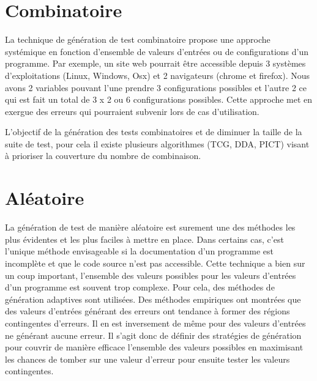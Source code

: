 
\section{Combinatoire}

La technique de génération de test combinatoire propose une approche systémique en fonction d'ensemble de valeurs d'entrées ou de configurations d'un programme. Par exemple, un site web pourrait être accessible depuis 3 systèmes d'exploitations (Linux, Windows, Osx) et 2 navigateurs (chrome et firefox). Nous avons 2 variables pouvant l'une prendre 3 configurations possibles et l'autre 2 ce qui est fait un total de 3 x 2 ou 6 configurations possibles.
Cette approche met en exergue des erreurs qui pourraient subvenir lors de cas d'utilisation.

L'objectif de la génération des tests combinatoires et de diminuer la taille de la suite de test, pour cela il existe plusieurs algorithmes (TCG, DDA, PICT) visant à prioriser la couverture du nombre de combinaison. 


\section{Aléatoire}

La génération de test de manière aléatoire est surement une des méthodes les plus évidentes et les plus faciles à mettre en place. Dans certains cas, c'est l'unique méthode envisageable si la documentation d'un programme est incomplète et que le code source n'est pas accessible. Cette technique a bien sur un coup important, l'ensemble des valeurs possibles pour les valeurs d'entrées d'un programme est souvent trop complexe. 
Pour cela, des méthodes de génération adaptives sont utilisées. Des méthodes empiriques ont montrées que des valeurs d'entrées générant des erreurs ont tendance à former des régions contingentes d'erreurs. Il en est inversement de même pour des valeurs d'entrées ne générant aucune erreur\cite{ART}.
Il s'agit donc de définir des stratégies de génération pour couvrir de manière efficace l'ensemble des valeurs possibles en maximisant les chances de tomber sur une valeur d'erreur pour ensuite tester les valeurs contingentes.


